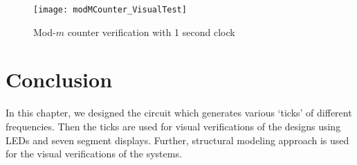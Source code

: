 \begin{figure}[!h]
	\centering
	\texttt{[image: modMCounter\_VisualTest]}
	\caption{Mod-$m$ counter verification with 1 second clock}
	\label{fig:modMCounter_VisualTest}
\end{figure}

\section{Conclusion}
In this chapter, we designed the circuit which generates various `ticks' of different frequencies. Then the ticks are used for visual verifications of the designs using LEDs and seven segment displays. Further, structural modeling approach is used for the visual verifications of the systems.

